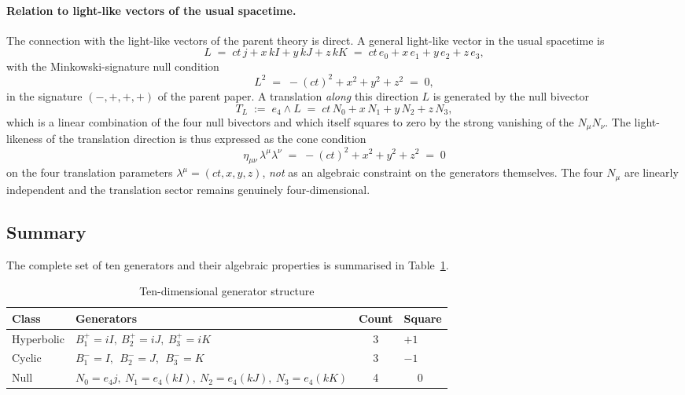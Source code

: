\documentclass[dvipdfmx,a4paper]{article}
\theoremstyle{definition}
\theoremstyle{plain}
\theoremstyle{remark}
\begin{document}
\paragraph{Relation to light-like vectors of the usual spacetime.}
The connection with the light-like vectors of the parent theory is direct. A general light-like vector in the usual spacetime is
\[
L \;=\; ct\,j + x\,kI + y\,kJ + z\,kK \;=\; ct\,e_{0} + x\,e_{1} + y\,e_{2} + z\,e_{3},
\]
with the Minkowski-signature null condition
\[
L^{2} \;=\; -(ct)^{2} + x^{2} + y^{2} + z^{2} \;=\; 0,
\]
in the signature \((-,+,+,+)\) of the parent paper. A translation \emph{along} this direction \(L\) is generated by the null bivector
\[
T_{L} \;:=\; e_{4}\wedge L \;=\; ct\,N_{0} + x\,N_{1} + y\,N_{2} + z\,N_{3},
\]
which is a linear combination of the four null bivectors and which itself squares to zero by the strong vanishing of the \(N_{\mu}N_{\nu}\). The light-likeness of the translation direction is thus expressed as the cone condition
\[
\eta_{\mu\nu}\,\lambda^{\mu}\lambda^{\nu} \;=\; -(ct)^{2}+x^{2}+y^{2}+z^{2} \;=\; 0
\]
on the four translation parameters \(\lambda^{\mu}=(ct,x,y,z)\), \emph{not} as an algebraic constraint on the generators themselves. The four \(N_{\mu}\) are linearly independent and the translation sector remains genuinely four-dimensional.

\subsection{Summary}

The complete set of ten generators and their algebraic properties is summarised in Table~\ref{tab:generators}.

\begin{table}[htbp]
\centering
\caption{Ten-dimensional generator structure}
\label{tab:generators}
\begin{tabular}{llcl}
\hline
Class          & Generators                                                            & Count & Square \\
\hline
Hyperbolic     & \(B_{1}^{+}=iI,\ B_{2}^{+}=iJ,\ B_{3}^{+}=iK\)                        & 3     & \(+1\) \\
Cyclic         & \(B_{1}^{-}=I,\ \ B_{2}^{-}=J,\ \ B_{3}^{-}=K\)                       & 3     & \(-1\) \\
Null           & \(N_{0}=e_{4}j,\ N_{1}=e_{4}(kI),\ N_{2}=e_{4}(kJ),\ N_{3}=e_{4}(kK)\) & 4     & \(\phantom{+}0\) \\
\hline
\end{tabular}
\end{table}
\end{document}
